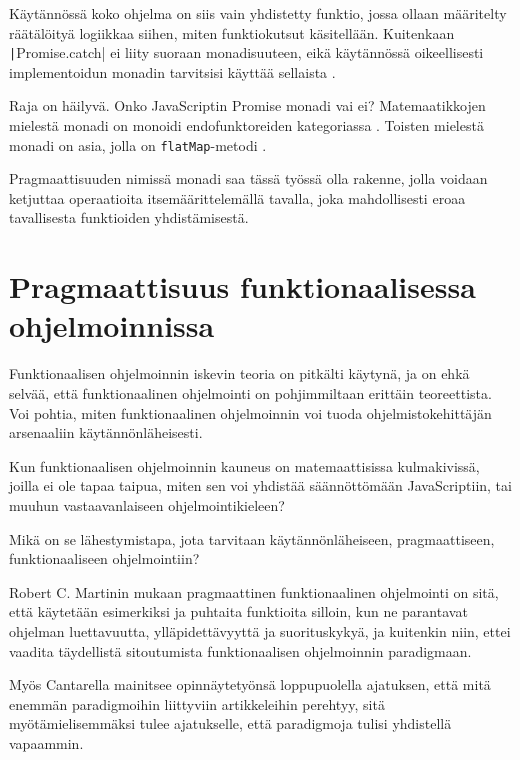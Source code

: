 Käytännössä koko ohjelma on siis vain yhdistetty funktio, jossa ollaan määritelty räätälöityä logiikkaa siihen, miten funktiokutsut käsitellään. Kuitenkaan \texttt|Promise.catch| ei liity suoraan monadisuuteen, eikä käytännössä oikeellisesti implementoidun monadin tarvitsisi käyttää sellaista \cite{promises-spec-94}.

Raja on häilyvä. Onko JavaScriptin Promise monadi vai ei? Matemaatikkojen mielestä monadi on  monoidi endofunktoreiden kategoriassa \cite{bartosz_category_for_progamers_10,monad_wikipedia,stackoverflow_what_monad}. Toisten mielestä monadi on asia, jolla on \texttt{flatMap}-metodi \cite{stackoverflow_flatmap_monad}.

Pragmaattisuuden nimissä monadi saa tässä työssä olla rakenne, jolla voidaan ketjuttaa operaatioita itsemäärittelemällä tavalla, joka mahdollisesti eroaa tavallisesta funktioiden yhdistämisestä.


\section{Pragmaattisuus funktionaalisessa ohjelmoinnissa}

Funktionaalisen ohjelmoinnin iskevin teoria on pitkälti käytynä, ja on ehkä selvää, että funktionaalinen ohjelmointi on pohjimmiltaan erittäin teoreettista. Voi pohtia, miten funktionaalinen ohjelmoinnin voi tuoda ohjelmistokehittäjän arsenaaliin käytännönläheisesti.

Kun funktionaalisen ohjelmoinnin kauneus on matemaattisissa kulmakivissä, joilla ei ole tapaa taipua, miten sen voi yhdistää säännöttömään JavaScriptiin, tai muuhun vastaavanlaiseen ohjelmointikieleen?

Mikä on se lähestymistapa, jota tarvitaan käytännönläheiseen, pragmaattiseen, funktionaaliseen ohjelmointiin?

Robert C. Martinin mukaan pragmaattinen funktionaalinen ohjelmointi on sitä, että käytetään esimerkiksi  ja puhtaita funktioita silloin, kun ne parantavat ohjelman luettavuutta, ylläpidettävyyttä ja suorituskykyä, ja kuitenkin niin, ettei vaadita täydellistä sitoutumista funktionaalisen ohjelmoinnin paradigmaan. \citep{martin2017pragmaticfp}

Myös Cantarella mainitsee opinnäytetyönsä loppupuolella ajatuksen, että mitä enemmän paradigmoihin liittyviin artikkeleihin perehtyy, sitä myötämielisemmäksi tulee ajatukselle, että paradigmoja tulisi yhdistellä vapaammin. \citep[45]{cantarella_fp_haitat}

